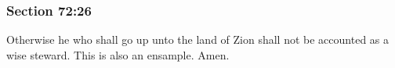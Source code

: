 	\subsubsection{Section 72:26} %
		\label{DC72-26}

		Otherwise he who shall go up unto the land of Zion shall not be accounted as a wise steward.  This is also an ensample.  Amen.

